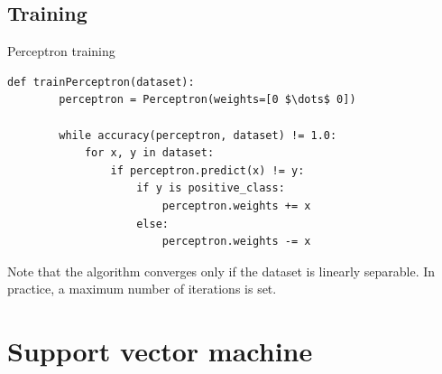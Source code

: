 \subsection{Training}
\begin{algorithm}
\caption{Perceptron training}
\begin{lstlisting}[mathescape=true]
    def trainPerceptron(dataset):
        perceptron = Perceptron(weights=[0 $\dots$ 0])
        
        while accuracy(perceptron, dataset) != 1.0:
            for x, y in dataset:
                if perceptron.predict(x) != y:
                    if y is positive_class:
                        perceptron.weights += x
                    else:
                        perceptron.weights -= x
\end{lstlisting}
\end{algorithm}

Note that the algorithm converges only if the dataset is linearly separable.
In practice, a maximum number of iterations is set.



\section{Support vector machine}


